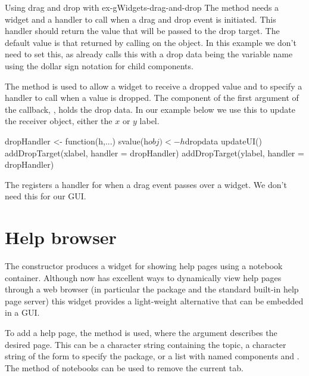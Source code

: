 \begin{example}{Using drag and drop with }{ex-gWidgets-drag-and-drop}
The  method needs a widget and a handler to
call when a drag and drop event is initiated. This handler should
return the value that will be passed to the drop target. The default
value is that returned by calling  on the object. In this
example we don't need to set this, as  already
calls this with a drop data being the variable name using the dollar
sign notation for child components.
    
The  method is used to allow a widget to
receive a dropped value and to specify a handler to call when a value
is dropped. The  component of the first argument of the
callback, , holds the drop data. In our example below we use
this to update the receiver object, either the $x$ or $y$ label.

\begin{Schunk}
\begin{Sinput}
 dropHandler <- function(h,...) {
   svalue(h$obj) <- h$dropdata
   updateUI()
 }
 addDropTarget(xlabel, handler = dropHandler)
 addDropTarget(ylabel, handler = dropHandler)
\end{Sinput}
\end{Schunk}


The  registers a handler for when a drag event
passes over a widget. We don't need this for our GUI.
    
\end{example}


\section{Help browser}
\label{sec:gWidgets-help-browser}

The  constructor produces a widget for showing help
pages using a notebook container. Although \R\/ now has excellent
ways to dynamically view help pages through a web browser (in
particular the  package and the standard built-in help
page server) this widget provides a light-weight alternative that can
be embedded in a GUI.

To add a help page, the  method is used,
where the  argument describes the desired page. This can
be a character string containing the topic, a character string of the
form  to specify the package, or a list with
named components  and .  The
 method of notebooks can be used to remove the
current tab.
\\


